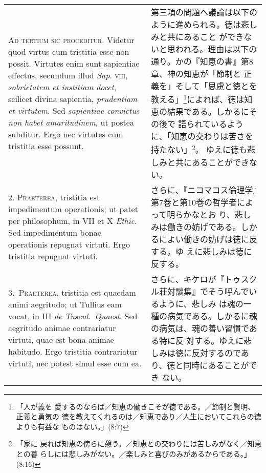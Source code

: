 \documentclass[10pt]{jsarticle}
\begin{document}
\begin{longtable}{p{21em}p{21em}}
{\scshape Ad tertium sic proceditur}. Videtur quod virtus cum
tristitia esse non possit. Virtutes enim sunt sapientiae effectus,
secundum illud {\itshape Sap}. {\scshape viii}, {\itshape sobrietatem
et iustitiam docet}, scilicet divina sapientia, {\itshape prudentiam
et virtutem}. Sed {\itshape sapientiae convictus non habet
amaritudinem}, ut postea subditur. Ergo nec virtutes cum tristitia
esse possunt.

&

 第三項の問題へ議論は以下のように進められる。徳は悲しみと共にあること
 ができないと思われる。理由は以下の通り。かの『知恵の書』第8章、神の知恵が「節制と
 正義を」そして「思慮と徳とを教える」\footnote{「人が義を
 愛するのならば／知恵の働きこそが徳である。／節制と賢明、正義と勇気の
 徳を教えてくれるのは／知恵であり／人生においてこれらの徳よりも有益な
 ものはない。」(8:7)}によれば、徳は知恵の結果である。しかるにその後で
 語られているように、「知恵の交わりは苦さを持たない」\footnote{「家に
 戻れば知恵の傍らに憩う。／知恵との交わりには苦しみがなく／知恵との暮
 らしには悲しみがない。／楽しみと喜びのみがあるからである。」(8:16)}。
 ゆえに徳も悲しみと共にあることができない。

\\

2. {\scshape Praeterea}, tristitia est impedimentum operationis; ut
patet per philosophum, in VII et X {\itshape Ethic}. Sed impedimentum
bonae operationis repugnat virtuti. Ergo tristitia repugnat virtuti.

&

 さらに、『ニコマコス倫理学』第7巻と第10巻の哲学者によって明らかなとお
 り、悲しみは働きの妨げである。しかるによい働きの妨げは徳に反する。ゆ
 えに悲しみは徳に反する。

\\

{\scshape 3.~Praeterea}, tristitia est quaedam animi aegritudo; ut
Tullius eam vocat, in III {\itshape de Tuscul.~Quaest}. Sed aegritudo
animae contrariatur virtuti, quae est bona animae habitudo. Ergo
tristitia contrariatur virtuti, nec potest simul esse cum ea.

&

 さらに、キケロが『トゥスクル荘対談集』でそう呼んでいるように、悲しみ
 は魂の一種の病気である。しかるに魂の病気は、魂の善い習慣である特に反
 対する。ゆえに悲しみは徳に反対するのであり、徳と同時にあることができ
 ない。

\\



\end{longtable}
\end{document}
